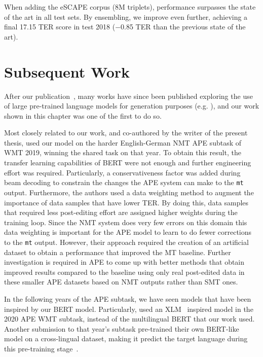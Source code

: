 When adding the eSCAPE corpus (8M triplets), performance surpasses
the state of the art in all test sets. By ensembling, we improve even
further, achieving a final 17.15 TER score in test 2018 ($-$0.85 TER
than the previous state of the art).

\section{Subsequent Work}

After our publication~\citep{Correia2019}, many works have since been
published exploring the use of large pre-trained language models for
generation purposes (e.g.
\citep{zhang2019PretrainingBasedNaturalLanguage,
  chen2020DistillingKnowledgeLearned}), and our work shown in this
chapter was one of the first to do so. %

Most closely related to our work, and co-authored by the writer of
the present thesis, \citet{lopes2019unbabels} used our model on the
harder English-German NMT APE subtask of WMT 2019, winning the shared
task on that year. To obtain this result, the transfer learning
capabilities of BERT were not enough and further engineering effort
was required. Particularly, a conservativeness factor was added
during beam decoding to constrain the changes the APE system can make
to the {\tt mt} output. Furthermore, the authors used a data
weighting method to augment the importance of data samples that have
lower TER. By doing this, data samples that required less
post-editing effort are assigned higher weights during the training
loop. Since the NMT system does very few errors on this domain this
data weighting is important for the APE model to learn to do fewer
corrections to the {\tt mt} output. However, their approach required
the creation of an artificial dataset to obtain a performance that
improved the MT baseline. Further investigation is required in APE to
come up with better methods that obtain improved results compared to
the baseline using only real post-edited data in these smaller APE
datasets based on NMT outputs rather than SMT ones.

In the following years of the APE subtask, we have seen models that
have been inspired by our BERT model. Particularly,
\citet{lee2020POSTECHETRISubmissionWMT2020} used an
XLM~\citep{lample2019xlm} inspired model in the 2020 APE WMT subtask,
instead of the multilingual BERT that our work used. Another
submission to that year's subtask pre-trained their own BERT-like
model on a cross-lingual dataset, making it predict the target
language during this pre-training
stage~\citep{wang2020AlibabaSubmissionWMT}.

